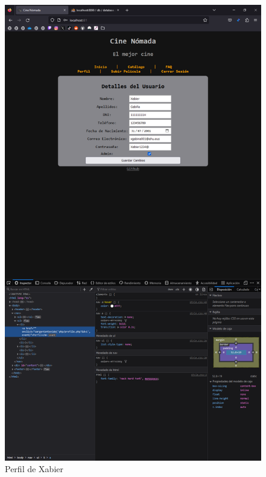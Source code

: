 \documentclass{report}
\begin{document}
                    \begin{figure}[H]
                        \centering
                        \includegraphics[width=\textwidth]{./img/vulnerabilidades/3.1.1.3.png}
                        \caption{Perfil de Xabier}
                    \end{figure}
\end{document}

